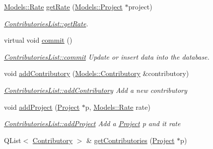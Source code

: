 \begin{DoxyCompactItemize}
\hyperlink{classModels_1_1Rate}{Models\-::\-Rate} \hyperlink{classModels_1_1ContributoriesList_a16118d05867f3e2550f44796400253b9}{get\-Rate} (\hyperlink{classModels_1_1Project}{Models\-::\-Project} $\ast$project)
\begin{DoxyCompactList}\small\item\em \hyperlink{classModels_1_1ContributoriesList_a16118d05867f3e2550f44796400253b9}{Contributories\-List\-::get\-Rate}. \end{DoxyCompactList}\item 
\hypertarget{classModels_1_1ContributoriesList_ad341e0527f4c9057281400f6cf54e54f}{virtual void \hyperlink{classModels_1_1ContributoriesList_ad341e0527f4c9057281400f6cf54e54f}{commit} ()}\label{classModels_1_1ContributoriesList_ad341e0527f4c9057281400f6cf54e54f}

\begin{DoxyCompactList}\small\item\em \hyperlink{classModels_1_1ContributoriesList_ad341e0527f4c9057281400f6cf54e54f}{Contributories\-List\-::commit} Update or insert data into the database. \end{DoxyCompactList}\item 
void \hyperlink{classModels_1_1ContributoriesList_a62b01d5292326da5902589ddb9b71234}{add\-Contributory} (\hyperlink{classModels_1_1Contributory}{Models\-::\-Contributory} \&contributory)
\begin{DoxyCompactList}\small\item\em \hyperlink{classModels_1_1ContributoriesList_a62b01d5292326da5902589ddb9b71234}{Contributories\-List\-::add\-Contributory} Add a new {\itshape contributory} \end{DoxyCompactList}\item 
void \hyperlink{classModels_1_1ContributoriesList_a4c99c890fc7d7616678d6e5f7ee558f5}{add\-Project} (\hyperlink{classModels_1_1Project}{Project} $\ast$p, \hyperlink{classModels_1_1Rate}{Models\-::\-Rate} rate)
\begin{DoxyCompactList}\small\item\em \hyperlink{classModels_1_1ContributoriesList_a4c99c890fc7d7616678d6e5f7ee558f5}{Contributories\-List\-::add\-Project} Add a \hyperlink{classModels_1_1Project}{Project} {\itshape p} and it {\itshape rate} \end{DoxyCompactList}\item 
Q\-List$<$ \hyperlink{classModels_1_1Contributory}{Contributory} $>$ \& \hyperlink{classModels_1_1ContributoriesList_a2549547fd3866d879ebbfd1f38145fc5}{get\-Contributories} (\hyperlink{classModels_1_1Project}{Project} $\ast$p)

\end{DoxyCompactItemize}
